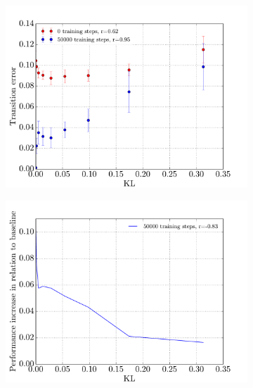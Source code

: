 \begin{figure}[p]
\begin{subfigure}{0.48\textwidth}
    	\centering
        \includegraphics[width=\textwidth]{results/mc2_correlation_inequality_kl_train}
        \caption{}
        \label{fig:mc2-kl}
    \end{subfigure}
    \hfill
    \begin{subfigure}{0.48\textwidth}
    	\centering
        \includegraphics[width=\textwidth]{results/mc2_correlation_inequality_kl_train_baseline}
        \caption{}
        \label{fig:mc2-kl-baseline}
    \end{subfigure}
    \begin{subfigure}{0.48\textwidth}
    	\centering

\end{subfigure}
\end{figure}
